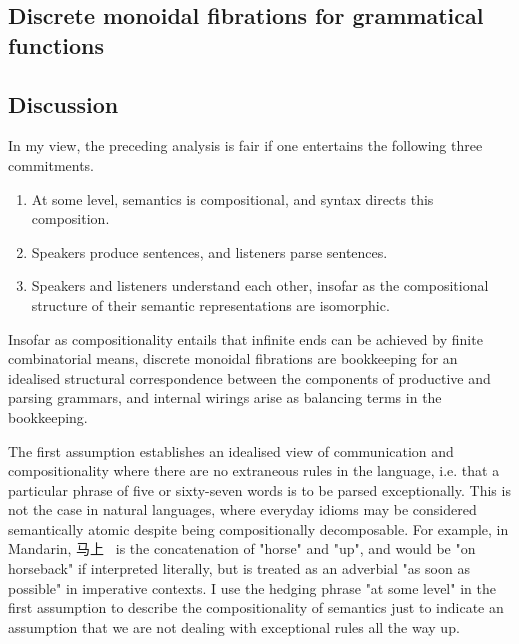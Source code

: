\subsection{Discrete monoidal fibrations for grammatical functions}

\subsection{Discussion}

 In my view, the preceding analysis is fair if one entertains the following three commitments.

\begin{enumerate}
\item{At some level, semantics is compositional, and syntax directs this composition.}
\item{Speakers produce sentences, and listeners parse sentences.}
\item{Speakers and listeners understand each other, insofar as the compositional structure of their semantic representations are isomorphic.}
\end{enumerate}

Insofar as compositionality entails that infinite ends can be achieved by finite combinatorial means, discrete monoidal fibrations are bookkeeping for an idealised structural correspondence between the components of productive and parsing grammars, and internal wirings arise as balancing terms in the bookkeeping.\\

\begin{CJK*}{UTF8}{gbsn}
The first assumption establishes an idealised view of communication and compositionality where there are no extraneous rules in the language, i.e. that a particular phrase of five or sixty-seven words is to be parsed exceptionally. This is not the case in natural languages, where everyday idioms may be considered semantically atomic despite being compositionally decomposable. For example, in Mandarin, 马上 \ is the concatenation of "horse" and "up", and would be "on horseback" if interpreted literally, but is treated as an adverbial "as soon as possible" in imperative contexts. I use the hedging phrase "at some level" in the first assumption to describe the compositionality of semantics just to indicate an assumption that we are not dealing with exceptional rules all the way up.\\
\end{CJK*}

